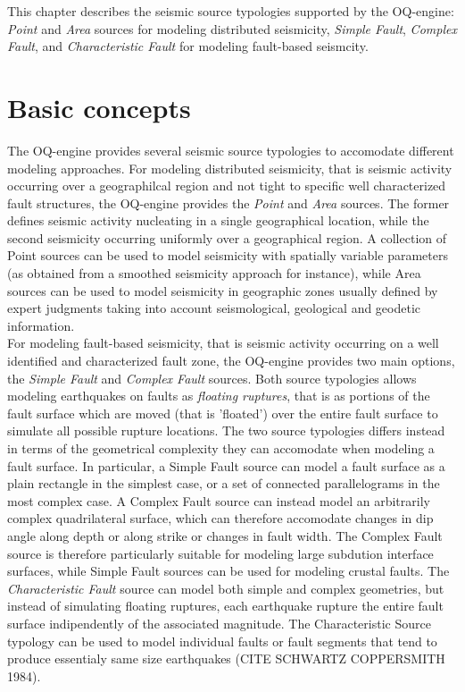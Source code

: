 This chapter describes the seismic source typologies supported by the OQ-engine: \textit{Point} and
\textit{Area} sources for modeling distributed seismicity, \textit{Simple Fault}, \textit{Complex Fault}, and
\textit{Characteristic Fault} for modeling fault-based seismcity.

\section{Basic concepts}
The OQ-engine provides several seismic source typologies to accomodate different modeling approaches. For modeling distributed seismicity, that is seismic activity occurring over a geographilcal region and not tight to
specific well characterized fault structures, the OQ-engine provides the \textit{Point} and \textit{Area} sources.
The former defines seismic activity nucleating in a single geographical location, while the second seismicity occurring uniformly over a geographical region. A collection of Point sources can be used to model seismicity with spatially variable parameters (as obtained from a smoothed seismicity approach for instance), while Area
sources can be used to model seismicity in geographic zones usually defined by expert judgments
taking into account seismological, geological and geodetic information.\\
For modeling fault-based seismicity, that is seismic activity occurring on a well identified and characterized
fault zone, the OQ-engine provides two main options, the \textit{Simple Fault} and \textit{Complex Fault}
sources. Both source typologies allows modeling earthquakes on faults as \textit{floating ruptures}, that is as
portions of the fault surface which are moved (that is 'floated') over the entire fault surface to simulate all possible rupture locations. The two source typologies differs instead in terms of the geometrical complexity
they can accomodate when modeling a fault surface. In particular, a Simple Fault source can model a fault
surface as a plain rectangle in the simplest case, or a set of connected parallelograms in the most complex
case. A Complex Fault source can instead model an arbitrarily complex quadrilateral surface, which can
therefore accomodate changes in dip angle along depth or along strike or changes in fault width. The
Complex Fault source is therefore particularly suitable for modeling large subdution interface surfaces, while
Simple Fault sources can be used for modeling crustal faults. The \textit{Characteristic Fault} source can model both simple and complex geometries, but instead of simulating floating ruptures, each earthquake
rupture the entire fault surface indipendently of the associated magnitude. The Characteristic Source typology
can be used to model individual faults or fault segments that tend to produce essentialy same size
earthquakes (CITE SCHWARTZ COPPERSMITH 1984).\\
